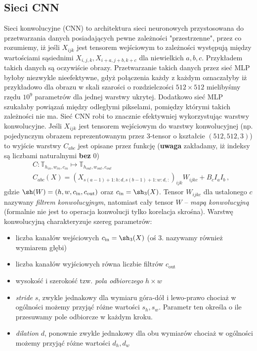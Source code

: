 \documentclass{myclass}
\begin{document}
\subsection{Sieci CNN}

Sieci konwolucyjne (CNN) to architektura sieci neuronowych przystosowana do przetwarzania danych
posiadających pewne zależności "przestrzenne", przez co rozumiemy, iż jeśli \(X_{ijk}\) jest
tensorem wejściowym to zależności występują między wartościami sąsiednimi \(X_{i,j,k},
X_{i+a,j+b,k+c}\) dla niewielkich \(a,b,c\). Przykładem takich danych są oczywiście obrazy.
Przetwarzanie takich danych przez sieć MLP byłoby niezwykle nieefektywne, gdyż połączenia każdy z
każdym oznaczałyby iż przykładowo dla obrazu w skali szarości o rozdzielczości \(512 \times 512\)
mielibyśmy rzędu \(10^9\) parametrów dla jednej warstwy ukrytej. Dodatkowo sieć MLP szukałaby
powiązań między odległymi pikselami, pomiędzy którymi takich zależności nie ma. Sieć CNN robi to
znacznie efektywniej wykorzystując warstwy konwolucyjne. Jeśli \(X_{ijk}\) jest tensorem wejściowym
do warstwy konwolucyjnej (np. pojedynczym obrazem reprezentowanym przez 3-tensor o kształcie \((512,
512, 3)\)) to wyjście warstwy \(C_{abc}\) jest opisane przez funkcję (\textbf{uwaga} zakładamy, iż
indeksy są liczbami naturalnymi \textbf{bez} 0)
\begin{equation*}
    \begin{split}
        &C: \mathbb{T}_{h_{in},w_{in},c_{in}} \mapsto \mathbb{T}_{h_{out},w_{out},c_{out}}\\
        &C_{abc}(X) = (X_{s(a-1)+1:h:d,s(b-1)+1:w:d,:})_{ijk}W_{ijkc} + B_c I_a I_b\,,    
    \end{split}
\end{equation*}
gdzie \(\sh(W) = (h, w, c_\text{in}, c_\text{out})\) oraz \(c_\text{in} = \sh_3(X)\). Tensor
\(W_{ijkc}\) dla ustalonego \(c\) nazywany \textit{filtrem konwolucyjnym}, natomiast cały tensor
\(W\) -- \textit{mapą konwolucyjną} (formalnie nie jest to operacja konwolucji tylko korelacja
skrośna). Warstwę konwolucyjną charakteryzuje szereg parametrów:
\begin{itemize}
    \item liczba kanałów wejściowych \(c_\text{in} = \sh_3(X)\) (oś 3. nazywamy również wymiarem
    głębi)
    \item liczba kanałów wyjściowych równa liczbie filtrów \(c_\text{out}\)
    \item wysokość i szerokość tzw. \textit{pola odbiorczego} \(h \times w\)
    \item \textit{stride} \(s\), zwykle jednakowy dla wymiaru góra-dół i lewo-prawo chociaż w
    ogólności możemy przyjąć różne wartości \(s_h, s_w\). Parametr ten określa o ile przesuwamy pole
    odbiorcze w każdym kroku.
    \item \textit{dilation} \(d\), ponownie zwykle jednakowy dla obu wymiarów chociaż w ogólności
    możemy przyjąć różne wartości \(d_h, d_w\)
\end{itemize}
\end{document}
